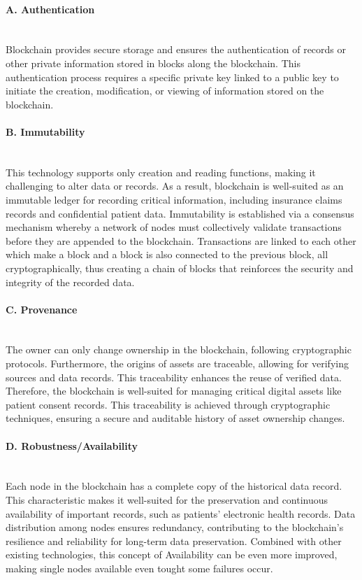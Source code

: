 \paragraph{A. Authentication} \mbox{}\\
Blockchain provides secure storage and ensures the authentication of records or other private information stored in blocks along the blockchain. This authentication process requires a specific private key linked to a public key to initiate the creation, modification, or viewing of information stored on the blockchain.

\paragraph{B. Immutability} \mbox{}\\
This technology supports only creation and reading functions, making it challenging to alter data or records. As a result, blockchain is well-suited as an immutable ledger for recording critical information, including insurance claims records and confidential patient data. Immutability is established via a consensus mechanism whereby a network of nodes must collectively validate transactions before they are appended to the blockchain. Transactions are linked to each other which make a block and a block is also connected to the previous block, all cryptographically, thus creating a chain of blocks that reinforces the security and integrity of the recorded data.

\paragraph{C. Provenance} \mbox{}\\
The owner can only change ownership in the blockchain, following cryptographic protocols. Furthermore, the origins of assets are traceable, allowing for verifying sources and data records. This traceability enhances the reuse of verified data. Therefore, the blockchain is well-suited for managing critical digital assets like patient consent records. This traceability is achieved through cryptographic techniques, ensuring a secure and auditable history of asset ownership changes.

\paragraph{D. Robustness/Availability}\mbox{}\\
Each node in the blockchain has a complete copy of the historical data record. This characteristic makes it well-suited for the preservation and continuous availability of important records, such as patients' electronic health records. Data distribution among nodes ensures redundancy, contributing to the blockchain's resilience and reliability for long-term data preservation. Combined with other existing technologies, this concept of Availability can be even more improved, making single nodes available even tought some failures occur.

